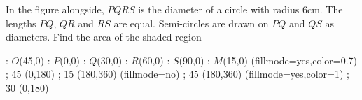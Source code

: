 
%
%
%
%
% 
% 

\question[3] In the figure alongside, $PQRS$ is the diameter of a circle with radius 6cm.
The lengths $PQ$, $QR$ and $RS$ are equal. Semi-circles are drawn on $PQ$ and $QS$ as diameters.
Find the area of the shaded region


\ifprintanswers
\fi 
\begin{marginfigure}

    : $O$(45,0)
    : $P$(0,0)
    : $Q$(30,0)
    : $R$(60,0)
    : $S$(90,0)
    : $M$(15,0)
  \figdrawbegin{}
    \figset (fillmode=yes,color=0.7)
     ; 45 (0,180)
     ; 15 (180,360)
    \figset (fillmode=no)
     ; 45 (180,360)
    \figset (fillmode=yes,color=1)
    \figdrawline [101,102,103,104]
     ; 30 (0,180)
  \figdrawend
  \centerline{\box\figBoxA}

\end{marginfigure}

